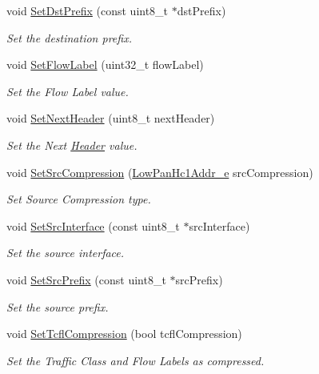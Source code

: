 \begin{DoxyCompactItemize}
void \hyperlink{classns3_1_1SixLowPanHc1_a8bcaab8d2b24bb5fcc4d604e04a1f82c}{Set\+Dst\+Prefix} (const uint8\+\_\+t $\ast$dst\+Prefix)
\begin{DoxyCompactList}\small\item\em Set the destination prefix. \end{DoxyCompactList}\item 
void \hyperlink{classns3_1_1SixLowPanHc1_a1496fec8f63ef4946b487c5436623012}{Set\+Flow\+Label} (uint32\+\_\+t flow\+Label)
\begin{DoxyCompactList}\small\item\em Set the Flow Label value. \end{DoxyCompactList}\item 
void \hyperlink{classns3_1_1SixLowPanHc1_a5c1b77d31f19fb3641edf1e072b368d5}{Set\+Next\+Header} (uint8\+\_\+t next\+Header)
\begin{DoxyCompactList}\small\item\em Set the Next \hyperlink{classns3_1_1Header}{Header} value. \end{DoxyCompactList}\item 
void \hyperlink{classns3_1_1SixLowPanHc1_a737b8f042d16276710557aeb642f7b45}{Set\+Src\+Compression} (\hyperlink{classns3_1_1SixLowPanHc1_a29c864d9bf6bc466ee2214a95a83dcad}{Low\+Pan\+Hc1\+Addr\+\_\+e} src\+Compression)
\begin{DoxyCompactList}\small\item\em Set Source Compression type. \end{DoxyCompactList}\item 
void \hyperlink{classns3_1_1SixLowPanHc1_ae5a3c0fd0262fcee25190327257cbce2}{Set\+Src\+Interface} (const uint8\+\_\+t $\ast$src\+Interface)
\begin{DoxyCompactList}\small\item\em Set the source interface. \end{DoxyCompactList}\item 
void \hyperlink{classns3_1_1SixLowPanHc1_ad8d77ab36835231c33ceb640e4d12cad}{Set\+Src\+Prefix} (const uint8\+\_\+t $\ast$src\+Prefix)
\begin{DoxyCompactList}\small\item\em Set the source prefix. \end{DoxyCompactList}\item 
void \hyperlink{classns3_1_1SixLowPanHc1_a083ea242d5dabba51a849372506a7072}{Set\+Tcfl\+Compression} (bool tcfl\+Compression)
\begin{DoxyCompactList}\small\item\em Set the Traffic Class and Flow Labels as compressed. \end{DoxyCompactList}\item 

\end{DoxyCompactItemize}
